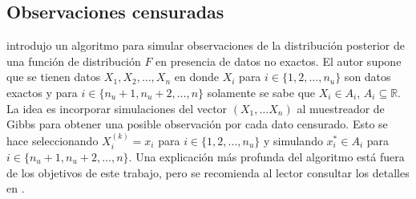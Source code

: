 \documentclass[11pt,a4paper]{article}
\begin{document}
\subsection{Observaciones censuradas}

\citet{doss_sampling} introdujo un algoritmo para simular observaciones de la distribución posterior de una función de distribución $F$ en presencia de datos no exactos. El autor supone que se tienen datos $X_1, X_2, \dots, X_n$ en donde $X_i$ para $i \in \lbrace 1, 2, \dots, n_u \rbrace$ son datos exactos y para $ i \in \lbrace n_u+1, n_u + 2, \dots, n \rbrace$ solamente se sabe que $X_i \in A_i$, $A_i \subseteq \mathbb{R}.$ La idea es incorporar simulaciones del vector $(X_1, \dots X_n)$ al muestreador de Gibbs para obtener una posible observación por cada dato censurado. Esto se hace seleccionando $X_i^{(k)} = x_i$ para $i \in \lbrace 1, 2, \dots, n_u \rbrace$ y simulando $x^*_i \in A_i$ para $ i \in \lbrace n_u+1, n_u + 2, \dots, n \rbrace$. Una explicación más profunda del algoritmo está fuera de los objetivos de este trabajo, pero se recomienda al lector consultar los detalles en \citet{doss_sampling}.\\
\end{document}
